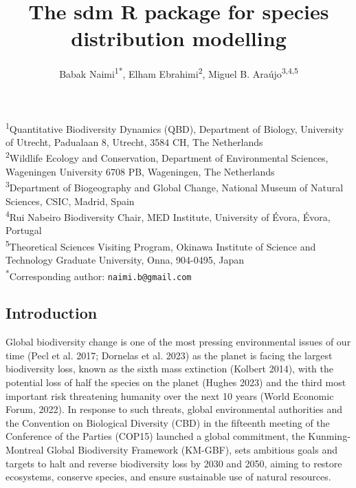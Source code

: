\documentclass[
]{article}
\title{The sdm R package for species distribution modelling}
\author{Babak Naimi\textsuperscript{1*}, Elham
Ebrahimi\textsuperscript{2}, Miguel B. Araújo\textsuperscript{3,4,5}}
\date{}
\begin{document}
\maketitle

\begin{center}
    \textsuperscript{1}Quantitative Biodiversity Dynamics (QBD), Department of Biology, University of Utrecht, Padualaan 8, Utrecht, 3584 CH, The Netherlands \\
    \textsuperscript{2}Wildlife Ecology and Conservation, Department of Environmental Sciences, Wageningen University 6708 PB, Wageningen, The Netherlands \\
    \textsuperscript{3}Department of Biogeography and Global Change, National Museum of Natural Sciences, CSIC, Madrid, Spain \\
    \textsuperscript{4}Rui Nabeiro Biodiversity Chair, MED Institute, University of Évora, Évora, Portugal \\
    \textsuperscript{5}Theoretical Sciences Visiting Program, Okinawa Institute of Science and Technology
Graduate University, Onna, 904-0495, Japan \\
    \vspace{0.3cm}
    \textsuperscript{*}Corresponding author: \texttt{naimi.b@gmail.com}
\end{center}

\maketitle

\subsection{Introduction}\label{introduction}

Global biodiversity change is one of the most pressing environmental
issues of our time (Pecl et al. 2017; Dornelas et al. 2023) as the
planet is facing the largest biodiversity loss, known as the sixth mass
extinction (Kolbert 2014), with the potential loss of half the species
on the planet (Hughes 2023) and the third most important risk
threatening humanity over the next 10 years (World Economic Forum,
2022). In response to such threats, global environmental authorities and
the Convention on Biological Diversity (CBD) in the fifteenth meeting of
the Conference of the Parties (COP15) launched a global commitment, the
Kunming-Montreal Global Biodiversity Framework (KM-GBF), sets ambitious
goals and targets to halt and reverse biodiversity loss by 2030 and
2050, aiming to restore ecosystems, conserve species, and ensure
sustainable use of natural resources.
\end{document}
